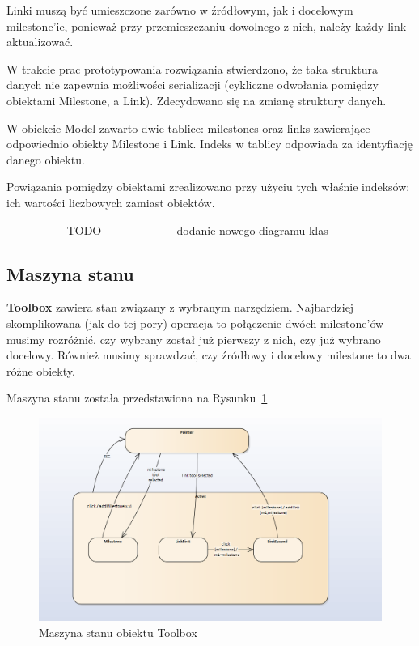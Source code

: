 Linki muszą być umieszczone zarówno w źródłowym, jak i docelowym milestone'ie, ponieważ przy przemieszczaniu dowolnego z nich, należy każdy link aktualizować.

W trakcie prac prototypowania rozwiązania stwierdzono, że taka struktura danych nie zapewnia możliwości serializacji (cykliczne odwołania pomiędzy obiektami Milestone, a Link). Zdecydowano się na zmianę struktury danych.

W obiekcie Model zawarto dwie tablice: milestones oraz links zawierające odpowiednio obiekty Milestone i Link. Indeks w tablicy odpowiada za identyfiację danego obiektu. 

Powiązania pomiędzy obiektami zrealizowano przy użyciu tych właśnie indeksów: ich wartości liczbowych zamiast obiektów.

---------------   TODO   ------------------   dodanie nowego diagramu klas   ------------------

\subsection{Maszyna stanu}
\textbf{Toolbox} zawiera stan związany z wybranym narzędziem. Najbardziej skomplikowana (jak do tej pory) operacja to połączenie dwóch milestone'ów - musimy rozróżnić, czy wybrany został już pierwszy z nich, czy już wybrano docelowy. Również musimy sprawdzać, czy źródłowy i docelowy milestone to dwa różne obiekty.

Maszyna stanu została przedstawiona na Rysunku~\ref{fig:fsm-toolbox}

\begin{figure}
	\centering
	\includegraphics[width=1\linewidth]{img/fsm-toolbox}
	\caption[Maszyna stanu obiektu Toolbox]{Maszyna stanu obiektu Toolbox}
	\label{fig:fsm-toolbox}
\end{figure}
